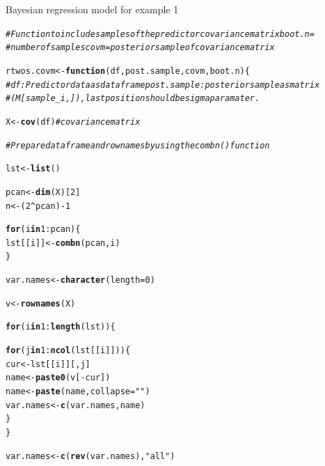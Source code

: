 \documentclass[11pt,a4paper,twoside]{book}\usepackage[]{graphicx}\usepackage[]{color}
\makeatletter
\newcommand{\hlnum}[1]{\textcolor[rgb]{0.686,0.059,0.569}{#1}}%
\newcommand{\hlstr}[1]{\textcolor[rgb]{0.192,0.494,0.8}{#1}}%
\newcommand{\hlcom}[1]{\textcolor[rgb]{0.678,0.584,0.686}{\textit{#1}}}%
\newcommand{\hlopt}[1]{\textcolor[rgb]{0,0,0}{#1}}%
\newcommand{\hlstd}[1]{\textcolor[rgb]{0.345,0.345,0.345}{#1}}%
\newcommand{\hlkwa}[1]{\textcolor[rgb]{0.161,0.373,0.58}{\textbf{#1}}}%
\newcommand{\hlkwb}[1]{\textcolor[rgb]{0.69,0.353,0.396}{#1}}%
\newcommand{\hlkwc}[1]{\textcolor[rgb]{0.333,0.667,0.333}{#1}}%
\newcommand{\hlkwd}[1]{\textcolor[rgb]{0.737,0.353,0.396}{\textbf{#1}}}%
\newenvironment{kframe}{%
 \def\at@end@of@kframe{}%
 \ifinner\ifhmode%
  \def\at@end@of@kframe{\end{minipage}}%
  \begin{minipage}{\columnwidth}%
 \fi\fi%
 \def\FrameCommand##1{\hskip\@totalleftmargin \hskip-\fboxsep
 \colorbox{shadecolor}{##1}\hskip-\fboxsep
     \hskip-\linewidth \hskip-\@totalleftmargin \hskip\columnwidth}%
 \MakeFramed {\advance\hsize-\width
   \@totalleftmargin\z@ \linewidth\hsize
   \@setminipage}}%
 {\par\unskip\endMakeFramed%
 \at@end@of@kframe}
\newenvironment{knitrout}{}{} %
\makeatother
\begin{document}
\begin{codeenv}

\caption{Bayesian regression model for example 1}\label{r03:LMG.covm}
\begin{knitrout}
\color{fgcolor}\begin{kframe}
\begin{alltt}
\hlcom{# Function to include samples of the predictor covariance matrix boot.n =}
\hlcom{# number of samples covm = posterior sample of covariance matrix}

\hlstd{rtwos.covm} \hlkwb{<-} \hlkwa{function}\hlstd{(}\hlkwc{df}\hlstd{,} \hlkwc{post.sample}\hlstd{,} \hlkwc{covm}\hlstd{,} \hlkwc{boot.n}\hlstd{) \{}
    \hlcom{# df: Predictor data as data frame post.sample: posterior sample as matrix}
    \hlcom{# (M[sample_i,]), last position should be sigma paramater.}

    \hlstd{X} \hlkwb{<-} \hlkwd{cov}\hlstd{(df)}  \hlcom{#covariance matrix}

    \hlcom{# Prepare data frame and rownames by using the combn() function}

    \hlstd{lst} \hlkwb{<-} \hlkwd{list}\hlstd{()}

    \hlstd{pcan} \hlkwb{<-} \hlkwd{dim}\hlstd{(X)[}\hlnum{2}\hlstd{]}
    \hlstd{n} \hlkwb{<-} \hlstd{(}\hlnum{2}\hlopt{^}\hlstd{pcan)} \hlopt{-} \hlnum{1}

    \hlkwa{for} \hlstd{(i} \hlkwa{in} \hlnum{1}\hlopt{:}\hlstd{pcan) \{}
        \hlstd{lst[[i]]} \hlkwb{<-} \hlkwd{combn}\hlstd{(pcan, i)}
    \hlstd{\}}

    \hlstd{var.names} \hlkwb{<-} \hlkwd{character}\hlstd{(}\hlkwc{length} \hlstd{=} \hlnum{0}\hlstd{)}

    \hlstd{v} \hlkwb{<-} \hlkwd{rownames}\hlstd{(X)}

    \hlkwa{for} \hlstd{(i} \hlkwa{in} \hlnum{1}\hlopt{:}\hlkwd{length}\hlstd{(lst)) \{}

        \hlkwa{for} \hlstd{(j} \hlkwa{in} \hlnum{1}\hlopt{:}\hlkwd{ncol}\hlstd{(lst[[i]])) \{}
            \hlstd{cur} \hlkwb{<-} \hlstd{lst[[i]][, j]}
            \hlstd{name} \hlkwb{<-} \hlkwd{paste0}\hlstd{(v[}\hlopt{-}\hlstd{cur])}
            \hlstd{name} \hlkwb{<-} \hlkwd{paste}\hlstd{(name,} \hlkwc{collapse} \hlstd{=} \hlstr{" "}\hlstd{)}
            \hlstd{var.names} \hlkwb{<-} \hlkwd{c}\hlstd{(var.names, name)}
        \hlstd{\}}
    \hlstd{\}}

    \hlstd{var.names} \hlkwb{<-} \hlkwd{c}\hlstd{(}\hlkwd{rev}\hlstd{(var.names),} \hlstr{"all"}\hlstd{)}


\end{alltt}
\end{kframe}
\end{knitrout}
\end{codeenv}
\end{document}
